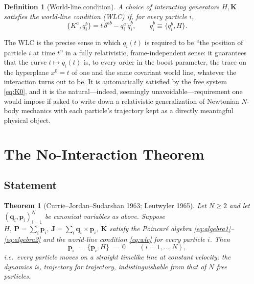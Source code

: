 \documentclass[11pt]{article}
\newtheorem{theorem}{Theorem}
\newtheorem{definition}{Definition}
\newcommand{\pb}[2]{\{#1,#2\}}
\newcommand{\bq}{\mathbf{q}}
\newcommand{\bp}{\mathbf{p}}
\newcommand{\bK}{\mathbf{K}}
\newcommand{\bJ}{\mathbf{J}}
\newcommand{\bP}{\mathbf{P}}
\begin{document}
\begin{definition}[World-line condition]
A choice of interacting generators $H,\bK$ satisfies the world-line condition (WLC) if, for every particle $i$,
\begin{equation}
\pb{K^a}{q_i^b} = t\,\delta^{ab} - q_i^a\,\dot q_i^b, \qquad \dot q_i^b \equiv \pb{q_i^b}{H}.
\label{eq:wlc}
\end{equation}
\end{definition}

The WLC is the precise sense in which $q_i(t)$ is required to be ``the position of particle $i$ at time $t$'' in a fully relativistic, frame-independent sense: it guarantees that the curve $t\mapsto q_i(t)$ is, to every order in the boost parameter, the trace on the hyperplane $x^0=t$ of one and the same covariant world line, whatever the interaction turns out to be. It is automatically satisfied by the free system \eqref{eq:K0}, and it is the natural---indeed, seemingly unavoidable---requirement one would impose if asked to write down a relativistic generalization of Newtonian $N$-body mechanics with each particle's trajectory kept as a directly meaningful physical object.

\section{The No-Interaction Theorem}
\label{sec:theorem}

\subsection{Statement}

\begin{theorem}[Currie--Jordan--Sudarshan 1963; Leutwyler 1965]
\label{thm:noint}
Let $N\ge 2$ and let $(\bq_i,\bp_i)_{i=1}^N$ be canonical variables as above. Suppose $H,\ \bP=\sum_i\bp_i,\ \bJ=\sum_i\bq_i\times\bp_i,\ \bK$ satisfy the Poincar\'e algebra \eqref{eq:algebra1}--\eqref{eq:algebra2} and the world-line condition \eqref{eq:wlc} for every particle $i$. Then
\begin{equation}
\dot{\bp}_i \;=\; \pb{\bp_i}{H} \;=\; 0 \qquad (i=1,\dots,N),
\end{equation}
i.e.\ every particle moves on a straight timelike line at constant velocity: the dynamics is, trajectory for trajectory, indistinguishable from that of $N$ free particles.
\end{theorem}
\end{document}
